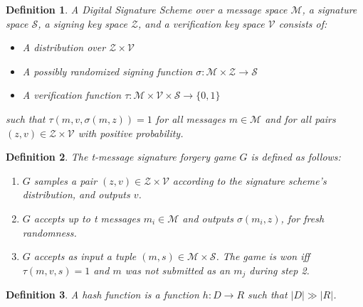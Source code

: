 \documentclass[a4paper,german]{article}
\newtheorem{definition}{Definition}
\begin{document}
\begin{definition}
	A Digital Signature Scheme over a message space $\mathcal{M}$, a signature space $\mathcal{S}$, a signing key space $\mathcal{Z}$, and a verification key space $\mathcal{V}$ consists of:

	\begin{itemize}
	
		\item  A distribution over $\mathcal{Z \times V}$
		\item  A possibly randomized signing function $\sigma : \mathcal{M \times Z} \rightarrow \mathcal{S}$
		\item  A verification function $\tau : \mathcal{M \times V \times S} \rightarrow \{0, 1\}$
	\end{itemize}

	such that $\tau(m, v, \sigma(m, z)) = 1$ for all messages $m \in \mathcal{M}$ and for all pairs $(z, v) \in \mathcal{Z \times V}$ with positive probability.
\end{definition}

\begin{definition}
	The t-message signature forgery game $G$ is defined as follows:

	\begin{enumerate}
	
		\item  $G$ samples a pair $(z, v) \in \mathcal{Z \times V}$ according to the signature scheme's distribution, and outputs $v$.

		\item  $G$ accepts up to t messages $m_i \in \mathcal{M}$ and outputs $\sigma(m_i, z)$, for fresh randomness. 
		\item  $G$ accepts as input a tuple $(m, s) \in \mathcal{M \times S}$. The game is won iff $\tau(m, v, s) = 1$ and $m$ was not submitted as an $m_j$ during step 2.
	
	\end{enumerate}
\end{definition}

\begin{definition}
	A hash function is a function $h: D \rightarrow R$ such that $|D| \gg |R|$.
\end{definition}
\end{document}
